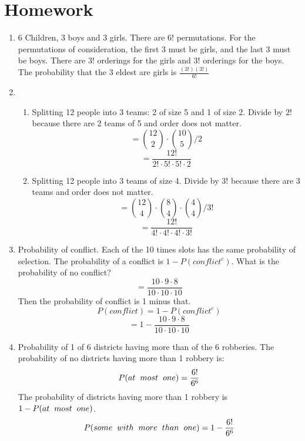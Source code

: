 \documentclass[11pt, oneside]{article}   	%
\begin{document}
\pagebreak
\section{Homework}
	\begin{enumerate}
		\item 6 Children, 3 boys and 3 girls. There are $6!$ permutations. For the permutations of consideration, the first 3 must be girls, and the last 3 must be boys. There are $3!$ orderings for the girls and $3!$ orderings for the boys. The probability that the 3 eldest are girls is $\frac{(3!)(3!)}{6!}$
		\item
			\begin{enumerate}
				\item Splitting 12 people into 3 teams: 2 of size 5 and 1 of size 2. Divide by $2!$ because there are 2 teams of 5 and order does not matter.
					\[
						= \binom{12}{2} \cdot \binom{10}{5} / 2
					\]
					\[
						= \frac{12!}{2! \cdot 5! \cdot 5! \cdot 2}
					\]
				\item Splitting 12 people into 3 teams of size 4. Divide by $3!$ because there are 3 teams and order does not matter.
					\[
						= \binom{12}{4} \cdot \binom{8}{4} \cdot \binom{4}{4} / 3!
					\]
					\[
						= \frac{12!}{4! \cdot 4! \cdot 4! \cdot 3!}
					\]			
			\end{enumerate}
		\item Probability of conflict. Each of the 10 times slots has the same probability of selection. The probability of a conflict is $1 - P(conflict^{c})$. What is the probability of no conflict?
			\[
				= \frac{10 \cdot 9 \cdot 8}{10 \cdot 10 \cdot 10}
			\]
			Then the probability of conflict is 1 minus that.
			\[
			P(conflict) = 1 - P(conflict^{c})	
			\]
			\[
				= 1 - \frac{10 \cdot 9 \cdot 8}{10 \cdot 10 \cdot 10}
			\]
		\item Probability of 1 of 6 districts having more than of the 6 robberies.
			The probability of no districts having more than 1 robbery is:
			\[
				P(at \hspace{2mm} most \hspace{2mm} one) = \frac{6!}{6^{6}}
			\]
			The probability of districts having more than 1 robbery is $1 - P(at \hspace{2mm} most \hspace{2mm} one)$.
			\[
				P(some \hspace{2mm} with \hspace{2mm} more \hspace{2mm} than \hspace{2mm} one) = 1 - \frac{6!}{6^{6}}
			\]
	\end{enumerate}
\end{document}
